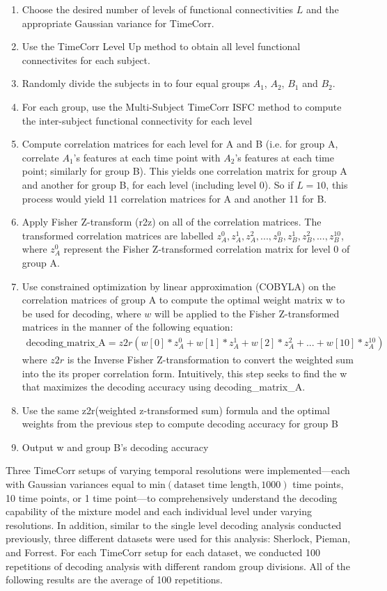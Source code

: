 \documentclass[11pt]{article}
\begin{document}
\begin{enumerate}
\item Choose the desired number of levels of functional connectivities $L$ and the appropriate Gaussian variance for TimeCorr.
\item Use the TimeCorr Level Up method to obtain all level functional connectivites for each subject.
\item Randomly divide the subjects in to four equal groups $A_1$, $A_2$, $B_1$ and $B_2$.
\item For each group, use the Multi-Subject TimeCorr ISFC method to compute the inter-subject functional connectivity for each level
\item Compute correlation matrices for each level for A and B (i.e. for group A, correlate $A_1$'s features at each time point with $A_2$'s features at each time point; similarly for group B). This yields one correlation matrix for group A and another for group B, for each level (including level 0). So if $L=10$, this process would yield 11 correlation matrices for A and another 11 for B.
\item Apply Fisher Z-transform (r2z) on all of the correlation matrices. The transformed correlation matrices are labelled $z_{A}^0, z_{A}^1, z_{A}^2, ..., z_{B}^0, z_{B}^1, z_{B}^2, ..., z_{B}^{10}$, where $z_{A}^0$ represent the Fisher Z-transformed correlation matrix for level 0 of group A.
\item Use constrained optimization by linear approximation (COBYLA) on the correlation matrices of group A to compute the optimal weight matrix w to be used for decoding, where $w$ will be applied to the Fisher Z-transformed matrices in the manner of the following equation:
\begin{align*}
\text{decoding\_matrix\_A} = z2r(w[0]*z_A^0 + w[1]*z_A^1 + w[2]*z_A^2 + ... + w[10]*z_A^{10})
\end{align*}
where $z2r$ is the Inverse Fisher Z-transformation to convert the weighted sum into the its proper correlation form. Intuitively, this step seeks to find the w that maximizes the decoding accuracy using decoding\_matrix\_A.
\item Use the same z2r(weighted z-transformed sum) formula and the optimal weights from the previous step to compute decoding accuracy for group B
\item Output w and group B's decoding accuracy
\end{enumerate}

Three TimeCorr setups of varying temporal resolutions were implemented---each with Gaussian variances equal to $\text{min}(\text{dataset time length},1000)$ time points, 10 time points, or 1 time point---to comprehensively understand the decoding capability of the mixture model and each individual level under varying resolutions. In addition, similar to the single level decoding analysis conducted previously, three different datasets were used for this analysis: Sherlock, Pieman, and Forrest. For each TimeCorr setup for each dataset, we conducted 100 repetitions of decoding analysis with different random group divisions. All of the following results are the average of 100 repetitions.
\end{document}
